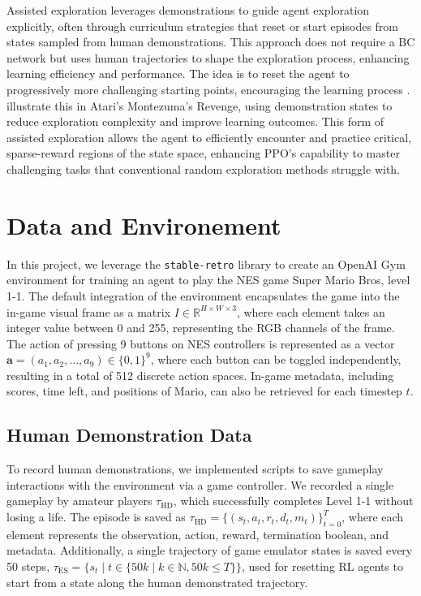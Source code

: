 \documentclass{article}
\begin{document}
Assisted exploration leverages demonstrations to guide agent exploration 
explicitly, often through curriculum strategies that reset or start episodes 
from states sampled from human demonstrations. This approach does not require 
a BC network but uses human trajectories to shape the exploration process, 
enhancing learning efficiency and performance.
The idea is to reset the agent 
to progressively more challenging starting points, encouraging the learning 
process \cite{florensa2018reversecurriculumgenerationreinforcement}. 
\cite{salimans2018learningmontezumasrevengesingle} illustrate this in Atari's 
Montezuma’s Revenge, using demonstration states to reduce exploration 
complexity and improve learning outcomes. This form of assisted exploration 
allows the agent to efficiently encounter and practice critical, sparse-reward 
regions of the state space, enhancing PPO's capability to master challenging 
tasks that conventional random exploration methods struggle with.


\section{Data and Environement}
In this project, we leverage the \texttt{stable-retro} library to create an OpenAI Gym 
environment for training an agent to play the NES game Super Mario Bros, level 1-1. The 
default integration of the environment encapsulates the game into the in-game visual 
frame as a matrix $I \in \mathbb{R}^{H \times W \times 3}$, where each element takes an 
integer value between 0 and 255, representing the RGB channels of the frame. The action 
of pressing 9 buttons on NES controllers is represented as a vector 
$\mathbf{a} = (a_1, a_2, \dots, a_9) \in \{0, 1\}^9$, where each button can be toggled 
independently, resulting in a total of 512 discrete action spaces. 
In-game metadata, including 
scores, time left, and positions of Mario, can also be retrieved for each timestep $t$.

\subsection{Human Demonstration Data}
\label{sec:hd_data}
To record human demonstrations, we implemented scripts to save gameplay 
interactions with the environment via a game controller. 
We recorded a single gameplay by amateur players $\tau_{\text{HD}}$, 
which successfully completes Level 1-1 without losing a life.
The episode is
saved as $\tau_{\text{HD}} = \{(s_t, a_t, r_t, d_t, m_t)\}_{t=0}^{T}$, where each 
element represents the observation, action, reward, termination boolean, and 
metadata.  
Additionally, a single trajectory 
of game emulator states is saved every 50 steps, 
$\tau_{\text{ES}} = \{ s_t \mid t \in \{ 50k \mid k\in \mathbb{N}, 50k \leq T \} \}$,
used for resetting RL agents 
to start from a state along the human demonstrated trajectory.
\end{document}

